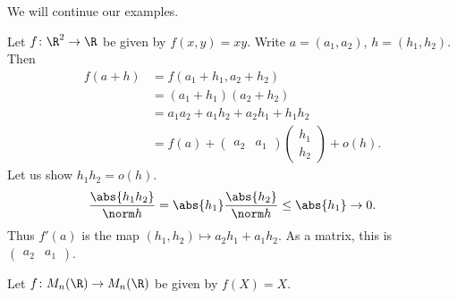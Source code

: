 
We will continue our examples.
\begin{examples}
    \item Let $f\colon \R^2 \to \R$ be given by $f(x, y) = xy$.
    Write $a = (a_1, a_2)$, $h = (h_1, h_2)$.
    Then \begin{align*}
        f(a + h) &= f(a_1 + h_1, a_2 + h_2) \\
            &= (a_1 + h_1)(a_2 + h_2) \\
            &= a_1 a_2 + a_1 h_2 + a_2 h_1 + h_1 h_2 \\
            &= f(a) + \begin{pmatrix}
                a_2 & a_1
            \end{pmatrix} \begin{pmatrix}
                h_1 \\ h_2
            \end{pmatrix} + o(h).
    \end{align*}
    Let us show $h_1 h_2 = o(h)$.
    \[
        \frac{\abs{h_1 h_2}}{\norm h}
            = \abs{h_1} \frac{\abs{h_2}}{\norm h}
            \le \abs{h_1} \to 0.
    \]
    Thus $f'(a)$ is the map $(h_1, h_2) \mapsto a_2 h_1 + a_1 h_2$.
    As a matrix, this is $\begin{pmatrix}
        a_2 & a_1
    \end{pmatrix}$.
    \item Let $f\colon M_n(\R) \to M_n(\R)$ be given by $f(X) = X$.


\end{examples}
